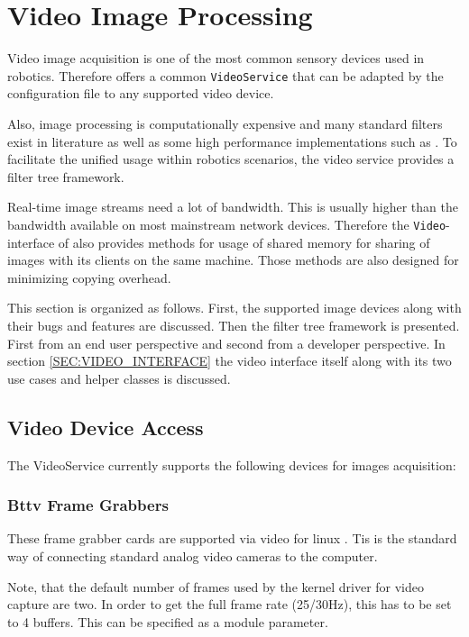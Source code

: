 \chapter{Video Image Processing}

Video image acquisition is one of the most common sensory
devices used in robotics. Therefore \miro offers a common
{\tt VideoService} that can be adapted by the configuration file to any
supported video device.

Also, image processing is computationally expensive and many standard
filters exist in literature as well as some high performance
implementations such as \cite{IPP}. To facilitate the unified usage
within robotics scenarios, the video service provides a filter tree
framework.

Real-time image streams need a lot of bandwidth. This is usually
higher than the bandwidth available on most mainstream network
devices. Therefore the {\tt Video}-interface of \miro also provides
methods for usage of shared memory for sharing of images with its
clients on the same machine. Those methods are also designed for
minimizing copying overhead.

This section is organized as follows. First, the supported image
devices along with their bugs and features are discussed. Then the
filter tree framework is presented. First from an end user
perspective and second from a developer perspective. In section
\ref{SEC:VIDEO_INTERFACE} the video interface itself along with its
two use cases and helper classes is discussed.

\section{Video Device Access}

The VideoService currently supports the following devices for images
acquisition:

\subsection{Bttv Frame Grabbers}

These frame grabber cards are supported via video for linux \cite{}.
Tis is the standard way of connecting standard analog video cameras
to the computer.

Note, that the default number of frames used by the kernel driver for
video capture are two. In order to get the full frame rate (25/30Hz),
this has to be set to 4 buffers. This can be specified as a module
parameter.

